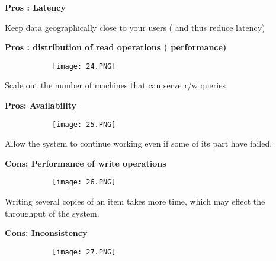 \documentclass{article}
\begin{document}
\vspace{3mm}
\textbf{Pros : Latency}
\vspace{2mm}

Keep data geographically close to your users ( and thus reduce latency)

\vspace{3mm}
\textbf{Pros : distribution of read operations ( performance) }
\vspace{2mm}

\begin{figure}[ht!]
  \centering
  \begin{subfigure}[b]{0.35\linewidth}
    \texttt{[image: 24.PNG]}
  \end{subfigure}
\end{figure}

Scale out the number of machines that can serve r/w queries

\vspace{3mm}
\textbf{Pros: Availability }
\vspace{2mm}


\begin{figure}[ht!]
  \centering
  \begin{subfigure}[b]{0.35\linewidth}
    \texttt{[image: 25.PNG]}
  \end{subfigure}
\end{figure}

Allow the system to continue working even if some of its part have failed.


\vspace{3mm}
\textbf{Cons: Performance of write operations }
\vspace{2mm}

\begin{figure}[ht!]
  \centering
  \begin{subfigure}[b]{0.35\linewidth}
    \texttt{[image: 26.PNG]}
  \end{subfigure}
\end{figure}

Writing several copies of an item takes more time, which may effect the throughput of the system.

\vspace{3mm}
\textbf{Cons: Inconsistency }
\vspace{2mm}

\begin{figure}[ht!]
  \centering
  \begin{subfigure}[b]{0.35\linewidth}
    \texttt{[image: 27.PNG]}
  \end{subfigure}
\end{figure}
\end{document}
